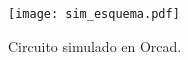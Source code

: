 \begin{figure}[H]
	\centering
	\texttt{[image: sim\_esquema.pdf]}
	\caption{Circuito simulado en Orcad.}
	\label{fig:sim_esquema}
\end{figure}
